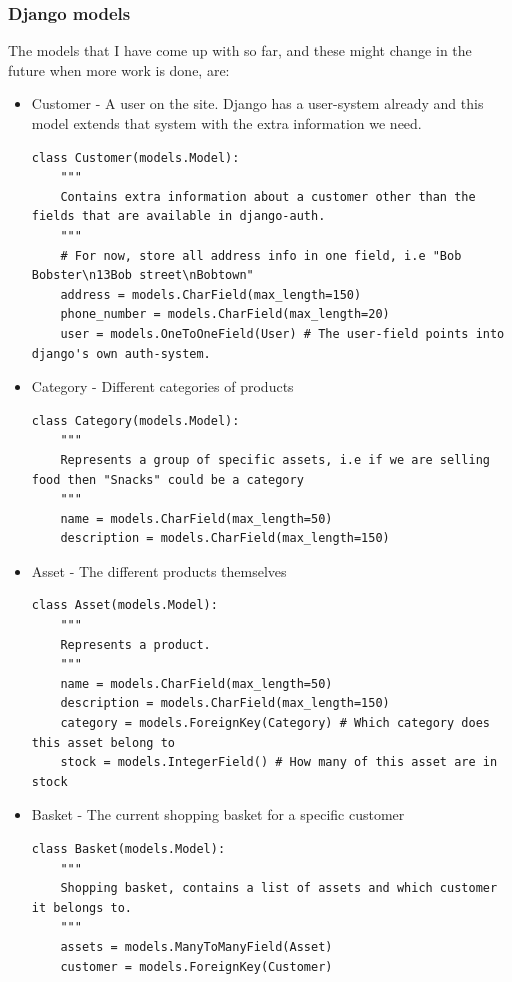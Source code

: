 \documentclass[12pt, a4paper,titlepage]{article}
\begin{document}
\subsubsection{Django models}
The models that I have come up with so far, and these might change in the
future when more work is done, are:

\begin{itemize}
\setlength\itemsep{-1pt}
\item Customer - A user on the site. Django has a user-system already and this
model extends that system with the extra information we need.
\begin{lstlisting}
class Customer(models.Model):
    """ 
    Contains extra information about a customer other than the fields that are available in django-auth.
    """
    # For now, store all address info in one field, i.e "Bob Bobster\n13Bob street\nBobtown"
    address = models.CharField(max_length=150) 
    phone_number = models.CharField(max_length=20)
    user = models.OneToOneField(User) # The user-field points into django's own auth-system.
\end{lstlisting}

\item Category - Different categories of products
\begin{lstlisting}
class Category(models.Model):
    """ 
    Represents a group of specific assets, i.e if we are selling food then "Snacks" could be a category
    """
    name = models.CharField(max_length=50)
    description = models.CharField(max_length=150)
\end{lstlisting}

\item Asset - The different products themselves
\begin{lstlisting}
class Asset(models.Model):
    """ 
    Represents a product.
    """
    name = models.CharField(max_length=50)
    description = models.CharField(max_length=150)
    category = models.ForeignKey(Category) # Which category does this asset belong to
    stock = models.IntegerField() # How many of this asset are in stock
\end{lstlisting}

\item Basket - The current shopping basket for a specific customer
\begin{lstlisting}
class Basket(models.Model):
    """
    Shopping basket, contains a list of assets and which customer it belongs to.
    """
    assets = models.ManyToManyField(Asset)
    customer = models.ForeignKey(Customer)
\end{lstlisting}


\end{itemize}
\end{document}
